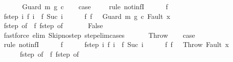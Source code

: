 \begin{isabellebody}
\ \ \isamarkupfalse%
\isanewline
{}\isamarkupfalse%
\isanewline
\ \ \isamarkupfalse%
\ {\isacharparenleft}Guard\ m\ g\ c{\isacharparenright}\isanewline
\ \ \isamarkupfalse%
\ {\isacharquery}case\ \isanewline
\ \ \isamarkupfalse%
\ {\isacharparenleft}rule\ not{\isacharunderscore}infI{\isacharparenright}\isanewline
\ \ \ \ \isamarkupfalse%
\ f\isanewline
\ \ \ \ \isamarkupfalse%
\ f{\isacharunderscore}step{\isacharcolon}\ {\isachardoublequoteopen}{\isasymAnd}i{\isachardot}\ {\isasymGamma}{\isasymturnstile}f\ i\ {\isasymrightarrow}\ f\ {\isacharparenleft}Suc\ i{\isacharparenright}{\isachardoublequoteclose}\isanewline
\ \ \ \ \isamarkupfalse%
\ f{\isacharunderscore}{}{\isacharcolon}\ {\isachardoublequoteopen}f\ {}\ {\isacharequal}\ {\isacharparenleft}Guard\ m\ g\ c{\isacharcomma}\ Fault\ x{\isacharparenright}{\isachardoublequoteclose}\ \isanewline
\ \ \ \ \isamarkupfalse%
\ f{\isacharunderscore}step\ {\isacharbrackleft}of\ {}{\isacharbrackright}\ f{\isacharunderscore}{}\ f{\isacharunderscore}step\ {\isacharbrackleft}of\ {}{\isacharbrackright}\isanewline
\ \ \ \ \isamarkupfalse%
\ False\isanewline
\ \ \ \ \ \ \isamarkupfalse%
\ {\isacharparenleft}fastforce\ elim{\isacharcolon}\ Skip{\isacharunderscore}no{\isacharunderscore}step\ step{\isacharunderscore}elim{\isacharunderscore}cases{\isacharparenright}\isanewline
\ \ \isamarkupfalse%
\isanewline
{}\isamarkupfalse%
\isanewline
\ \ \isamarkupfalse%
\ Throw\isanewline
\ \ \isamarkupfalse%
\ {\isacharquery}case\ \isanewline
\ \ \isamarkupfalse%
\ {\isacharparenleft}rule\ not{\isacharunderscore}infI{\isacharparenright}\isanewline
\ \ \ \ \isamarkupfalse%
\ f\isanewline
\ \ \ \ \isamarkupfalse%
\ f{\isacharunderscore}step{\isacharcolon}\ {\isachardoublequoteopen}{\isasymAnd}i{\isachardot}\ {\isasymGamma}{\isasymturnstile}f\ i\ {\isasymrightarrow}\ f\ {\isacharparenleft}Suc\ i{\isacharparenright}{\isachardoublequoteclose}\isanewline
\ \ \ \ \isamarkupfalse%
\ f{\isacharunderscore}{}{\isacharcolon}\ {\isachardoublequoteopen}f\ {}\ {\isacharequal}\ {\isacharparenleft}Throw{\isacharcomma}\ Fault\ x{\isacharparenright}{\isachardoublequoteclose}\ \isanewline
\ \ \ \ \isamarkupfalse%
\ f{\isacharunderscore}step\ {\isacharbrackleft}of\ {}{\isacharbrackright}\ f{\isacharunderscore}{}\ f{\isacharunderscore}step\ {\isacharbrackleft}of\ {}{\isacharbrackright}\isanewline

\end{isabellebody}
